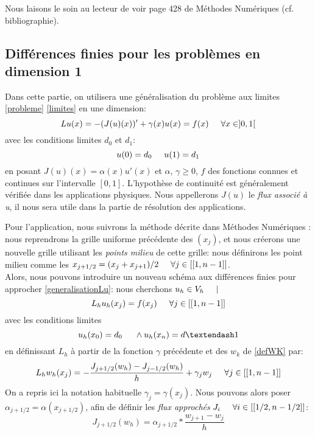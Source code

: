 \documentclass[12pt]{article}
\newcommand{\espace}{\hspace{5mm}}
\begin{document}
Nous laisons le soin au lecteur de voir page 428 de Méthodes Numériques (cf. bibliographie).

\subsection{Différences finies pour les problèmes en dimension 1}
Dans cette partie, on utilisera une généralisation du problème aux limites \eqref{probleme} \eqref{limites} en une dimension:
\begin{equation} \label{generalisationLu}
Lu(x) = -(J(u)(x))' + \gamma (x) u(x)  = f(x) \espace \forall x \in ]0,1[
\end{equation}
avec les conditions limites $d_0$ et $d_1$:
\begin{equation}
u(0) = d_0 \espace u(1) = d_1
\end{equation}
en posant $J(u)(x) = \alpha(x) u'(x)$ et $\alpha$, $\gamma \ge 0$, $f$ des fonctions connues et continues sur l'intervalle $[0,1]$. L'hypothèse de continuité est généralement vérifiée dans les applications physiques.  Nous appellerons $J(u)$ le \emph{flux associé à u}, il nous sera utile dans la partie de résolution des applications.

Pour l'application, nous suivrons la méthode décrite dans Méthodes Numériques : nous reprendrons la grille uniforme précédente des $(x_j)$, et nous créerons une nouvelle grille utilisant les \emph{points milieu} de cette grille: nous définirons les point milieu comme les $x_{j+1/2} = (x_j + x_{j+1}) /2 \espace \forall j \in [[1,n-1]]$. \\
Alors, nous pouvons introduire un nouveau schéma aux différences finies pour approcher \eqref{generalisationLu}: nous cherchons $u_h \in V_h \espace |$
\begin{equation} \label{miseEnFormeTemporaire}
L_h u_h (x_j) = f(x_j) \espace \forall j \in [[1,n-1]]
\end{equation}
avec les conditions limites
\begin{equation}
u_h(x_0) = d_0 \espace \wedge u_h(x_n) = d–1
\end{equation}
en définissant $L_h$ à partir de la fonction $\gamma$ précédente et des $w_k$ de \eqref{defWK} par:
\begin{equation} \label{katto}
	L_h w_h (x_j) = - \frac{J_{j + 1/2}(w_h) - J_{j - 1/2}(w_h)}{h} + \gamma_j w_j  \espace \forall j \in [[1,n-1]]
\end{equation}
On a repris ici la notation habituelle $\gamma_j = \gamma(x_j)$. Nous pouvons alors poser $\alpha_{j+1/2} = \alpha(x_{j+1/2})$, afin de définir les \emph{flux approchés} $J_i \espace \forall i \in [[1/2,n-1/2]]$:
\begin{equation}
J_{j+1/2} (w_h) = \alpha_{j+1/2} * \frac{w_{j+1} - w_j}{h}
\end{equation}
\end{document}

